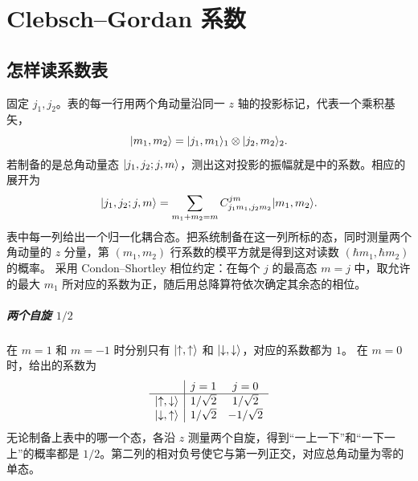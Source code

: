 \chapter{Clebsch--Gordan 系数}
\label{app:cg}

\section{怎样读系数表}
固定 $j_1,j_2$。表的每一行用两个角动量沿同一 $z$ 轴的投影标记，代表一个乘积基矢，
\[
    \lvert m_1,m_2\rangle = \lvert j_1,m_1\rangle_1 \otimes \lvert j_2,m_2\rangle_2 .
\]
若制备的是总角动量态 $\lvert j_1,j_2;j,m\rangle$，测出这对投影的振幅就是中的系数。相应的展开为
\begin{equation}
    \lvert j_1,j_2;j,m\rangle = \sum_{m_1+m_2=m} C^{jm}_{j_1m_1,j_2m_2}\lvert m_1,m_2\rangle.
\end{equation}
表中每一列给出一个归一化耦合态。把系统制备在这一列所标的态，同时测量两个角动量的 $z$ 分量，第 $(m_1,m_2)$ 行系数的模平方就是得到这对读数 $(\hbar m_1,\hbar m_2)$ 的概率。
采用 Condon--Shortley 相位约定：在每个 $j$ 的最高态 $m = j$ 中，取允许的最大 $m_1$ 所对应的系数为正，随后用总降算符依次确定其余态的相位。

\paragraph*{两个自旋 $1/2$}
在 $m = 1$ 和 $m = -1$ 时分别只有 $\lvert\mathord{\uparrow},\mathord{\uparrow}\rangle$ 和 $\lvert\mathord{\downarrow},\mathord{\downarrow}\rangle$，对应的系数都为 $1$。
在 $m = 0$ 时，给出的系数为
\begin{equation}
    \begin{array}{c|cc}
        & j = 1 & j = 0 \\ \hline
        \lvert\mathord{\uparrow},\mathord{\downarrow}\rangle & 1/\sqrt2 & 1/\sqrt2 \\
        \lvert\mathord{\downarrow},\mathord{\uparrow}\rangle & 1/\sqrt2 & -1/\sqrt2
    \end{array}
\end{equation}
无论制备上表中的哪一个态，各沿 $z$ 测量两个自旋，得到“一上一下”和“一下一上”的概率都是 $1/2$。第二列的相对负号使它与第一列正交，对应总角动量为零的单态。

